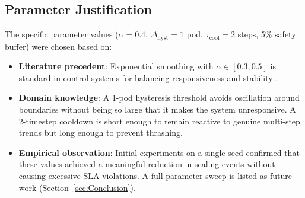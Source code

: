 \subsection{Parameter Justification}

The specific parameter values ($\alpha = 0.4$, $\Delta_{\text{hyst}} = 1$ pod, $\tau_{\text{cool}} = 2$ steps, 5\% safety buffer) were chosen based on:
\begin{itemize}
  \item \textbf{Literature precedent}: Exponential smoothing with $\alpha \in [0.3, 0.5]$ is standard in control systems for balancing responsiveness and stability \cite{MultipleOperatingLevels18}.
  \item \textbf{Domain knowledge}: A 1-pod hysteresis threshold avoids oscillation around boundaries without being so large that it makes the system unresponsive. A 2-timestep cooldown is short enough to remain reactive to genuine multi-step trends but long enough to prevent thrashing.
  \item \textbf{Empirical observation}: Initial experiments on a single seed confirmed that these values achieved a meaningful reduction in scaling events without causing excessive SLA violations. A full parameter sweep is listed as future work (Section~\ref{sec:Conclusion}).
\end{itemize}


